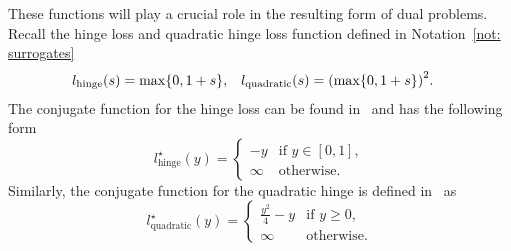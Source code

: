 These functions will play a crucial role in the resulting form of dual problems. Recall the hinge loss and quadratic hinge loss function defined in Notation~\ref{not: surrogates}
\begin{align*}
    l_{\text{hinge}}(s) & = \max\Brac[c]{0, 1 + s}, &
    l_{\text{quadratic}}(s) & = \Brac{\max\Brac[c]{0, 1 + s}}^2.
\end{align*}
The conjugate function for the hinge loss can be found in~\cite{shnlev2014accelerated} and has the following form
\begin{equation}\label{eq: conjugate hinge}
  l_{\text{hinge}}^{\star}(y) =
  \begin{cases}
    -y & \text{if } y \in [0, 1], \\
    \infty & \text{otherwise.}
  \end{cases}  
\end{equation}
Similarly, the conjugate function for the quadratic hinge is defined in~\cite{kanamori2013conjugate} as
\begin{equation}\label{eq: conjugate quadratic hinge}
  l_{\text{quadratic}}^{\star}(y) =
  \begin{cases}
    \frac{y^2}{4} - y & \text{if } y \geq 0, \\
    \infty & \text{otherwise.}
  \end{cases}
\end{equation}

